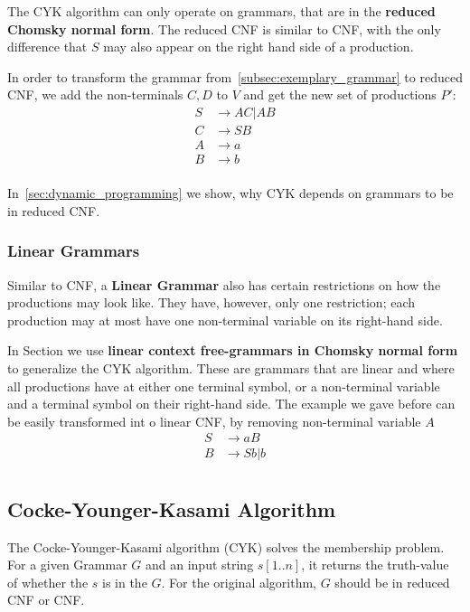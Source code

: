 The CYK algorithm can only operate on grammars, that are in the \textbf{reduced Chomsky normal form}.
The reduced CNF is similar to CNF, with the only difference that $S$ may also appear on the right hand side of a production.

In order to transform the grammar from~\ref{subsec:exemplary_grammar} to reduced CNF, we add the non-terminals $C,D$ to $V$ and get the new set of productions $P'$:
\begin{align*}
    S&\rightarrow AC | AB \\
    C&\rightarrow SB \\
    A&\rightarrow a \\
    B&\rightarrow b \\
\end{align*}

In~\ref{sec:dynamic_programming} we show, why CYK depends on grammars to be in reduced CNF.

\subsubsection{Linear Grammars}
Similar to CNF, a \textbf{Linear Grammar} also has certain restrictions on how the productions may look like.
They have, however, only one restriction; each production may at most have one non-terminal variable on its right-hand side.

In Section  we use \textbf{linear context free-grammars in Chomsky normal form} to generalize the CYK algorithm.
These are grammars that are linear and where all productions have at either one terminal symbol, or a non-terminal variable and a terminal symbol on their right-hand side.
The example we gave before can be easily transformed int o linear CNF, by removing non-terminal variable $A$
\begin{align*}
    S&\rightarrow aB \\
    B&\rightarrow Sb|b \\
\end{align*}


\subsection{Cocke-Younger-Kasami Algorithm}

The Cocke-Younger-Kasami algorithm (CYK) solves the membership problem.
For a given Grammar $G$ and an input string $s[1..n]$, it returns the truth-value of whether the $s$ is in the $G$.
For the original algorithm, $G$ should be in reduced CNF or CNF.

